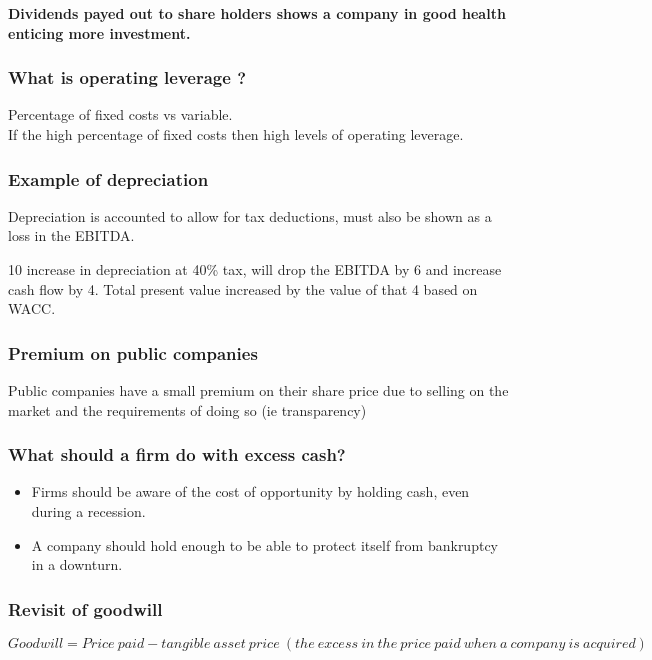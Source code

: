 \documentclass[11pt]{scrartcl} %
\begin{document}
\textbf{Dividends payed out to share holders shows a company in good health enticing more investment.}

\subsubsection{What is operating leverage ?}

Percentage of fixed costs vs variable.\\

If the high percentage of fixed costs then high levels of operating leverage.

\subsubsection{Example of depreciation}

Depreciation is accounted to allow for tax deductions, must also be shown as a loss in the EBITDA.

10 increase in depreciation at 40\% tax, will drop the EBITDA by 6 and increase cash flow by 4. 
Total present value increased by the value of that 4 based on WACC.

\subsubsection{Premium on public companies}

Public companies have a small premium on their share price due to selling on the market and the requirements of doing so (ie transparency)

\subsubsection{What should a firm do with excess cash?}

\begin{itemize}
	\item Firms should be aware of the cost of opportunity by holding cash, even during a recession.
	\item A company should hold enough to be able to protect itself from bankruptcy in a downturn.
\end{itemize}

\subsubsection{Revisit of goodwill}

\[ Goodwill = Price\:paid - tangible\:asset\:price\:(the\:excess\:in\:the\:price\:paid\:when\:a\:company\:is\:acquired) \]
\end{document}
